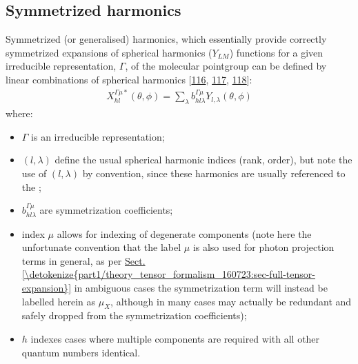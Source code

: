 \documentclass[letterpaper,table,10pt,english]{jupyterBook}
\begin{document}
\subsection{Symmetrized harmonics}
\label{\detokenize{part1/theory_observables_intro_100723:symmetrized-harmonics}}\label{\detokenize{part1/theory_observables_intro_100723:sec-theory-sym-harm-into}}
\sphinxAtStartPar
Symmetrized (or generalised) harmonics, which essentially provide correctly symmetrized expansions of spherical harmonics (\(Y_{LM}\)) functions for a given irreducible representation, \(\Gamma\), of the molecular point\sphinxhyphen{}group can be defined by linear combinations of spherical harmonics {[}\hyperlink{cite.backmatter/bibliography:id506}{116}, \hyperlink{cite.backmatter/bibliography:id507}{117}, \hyperlink{cite.backmatter/bibliography:id553}{118}{]}:
\begin{equation}\label{equation:part1/theory_observables_intro_100723:eq:symHarm-defn}
\begin{split}
X_{hl}^{\Gamma\mu*}(\theta,\phi)=\sum_{\lambda}b_{hl\lambda}^{\Gamma\mu}Y_{l,\lambda}(\theta,\phi)
\end{split}
\end{equation}
\sphinxAtStartPar
where:
\begin{itemize}
\item {} 
\sphinxAtStartPar
\(\Gamma\) is an irreducible representation;

\item {} 
\sphinxAtStartPar
\((l, \lambda)\) define the usual spherical harmonic indices (rank, order), but note the use of \((l, \lambda)\) by convention, since these harmonics are usually referenced to the {\hyperref[\detokenize{backmatter/glossary:term-MF}]{}};

\item {} 
\sphinxAtStartPar
\(b_{hl\lambda}^{\Gamma\mu}\) are symmetrization coefficients;

\item {} 
\sphinxAtStartPar
index \(\mu\) allows for indexing of degenerate components (note here the unfortunate convention that the label \(\mu\) is also used for photon projection terms in general, as per \hyperref[\detokenize{part1/theory_tensor_formalism_160723:sec-full-tensor-expansion}]{Sect.\@ \ref{\detokenize{part1/theory_tensor_formalism_160723:sec-full-tensor-expansion}}} \sphinxhyphen{} in ambiguous cases the symmetrization term will instead be labelled herein as \(\mu_X\), although in many cases may actually be redundant and safely dropped from the symmetrization coefficients);

\item {} 
\sphinxAtStartPar
\(h\) indexes cases where multiple components are required with all other quantum numbers identical.

\end{itemize}
\end{document}
